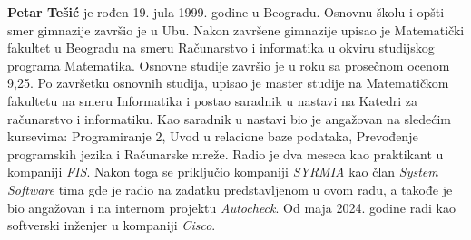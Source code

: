 \documentclass[12pt,oneside]{memoir}
\begin{document}
\begin{biografija}
\textbf{Petar Tešić}  je rođen 19. jula 1999. godine u Beogradu. Osnovnu školu i opšti smer 
gimnazije završio je u Ubu. Nakon završene gimnazije upisao je Matematički fakultet u Beogradu 
na smeru Računarstvo i informatika u okviru studijskog programa Matematika. Osnovne studije 
završio je u roku sa prosečnom ocenom 9,25. Po završetku osnovnih studija, upisao je master 
studije na Matematičkom fakultetu na smeru Informatika i postao saradnik u nastavi na Katedri za 
računarstvo i informatiku. Kao saradnik u nastavi bio je angažovan na sledećim kursevima: 
Programiranje 2, Uvod u relacione baze podataka, Prevođenje programskih jezika i Računarske 
mreže. Radio je dva meseca kao praktikant u kompaniji \textit{FIS}. Nakon toga se priključio kompaniji 
\textit{SYRMIA} kao član \textit{System Software} tima gde je radio na zadatku predstavljenom u ovom radu, a 
takođe je bio angažovan i na internom projektu \textit{Autocheck}. Od maja 2024. godine radi kao 
softverski inženjer u kompaniji \textit{Cisco}.
\end{biografija}
\end{document}
